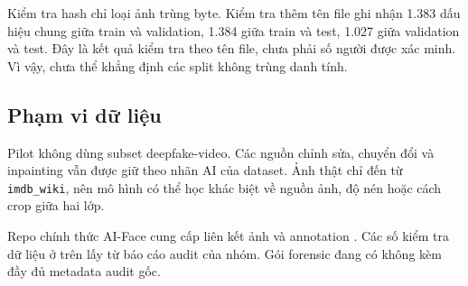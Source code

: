 Kiểm tra hash chỉ loại ảnh trùng byte. Kiểm tra thêm tên file ghi nhận 1.383 dấu hiệu chung giữa train và validation, 1.384 giữa train và test, 1.027 giữa validation và test. Đây là kết quả kiểm tra theo tên file, chưa phải số người được xác minh. Vì vậy, chưa thể khẳng định các split không trùng danh tính.

\subsection{Phạm vi dữ liệu}
Pilot không dùng subset deepfake-video. Các nguồn chỉnh sửa, chuyển đổi và inpainting vẫn được giữ theo nhãn AI của dataset. Ảnh thật chỉ đến từ \texttt{imdb\_wiki}, nên mô hình có thể học khác biệt về nguồn ảnh, độ nén hoặc cách crop giữa hai lớp.

Repo chính thức AI-Face cung cấp liên kết ảnh và annotation \cite{AI_Face_Repository}. Các số kiểm tra dữ liệu ở trên lấy từ báo cáo audit của nhóm. Gói forensic đang có không kèm đầy đủ metadata audit gốc.
